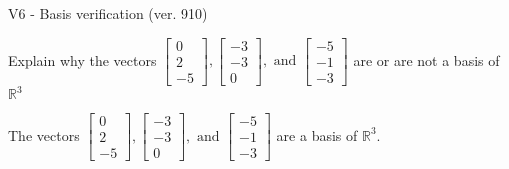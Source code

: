\begin{exercise}
  \begin{exerciseTitle}V6 - Basis verification (ver. 910)\end{exerciseTitle}
  \begin{exerciseStatement}
    Explain why the vectors \(\left[\begin{array}{r}
0 \\
2 \\
-5
\end{array}\right] , \left[\begin{array}{r}
-3 \\
-3 \\
0
\end{array}\right] , \text{ and } \left[\begin{array}{r}
-5 \\
-1 \\
-3
\end{array}\right]\) are or are not a basis of \(\mathbb{R}^3\)	


  \end{exerciseStatement}
  \begin{exerciseAnswer}
   The vectors \(\left[\begin{array}{r}
0 \\
2 \\
-5
\end{array}\right] , \left[\begin{array}{r}
-3 \\
-3 \\
0
\end{array}\right] , \text{ and } \left[\begin{array}{r}
-5 \\
-1 \\
-3
\end{array}\right]\) 
  	 are  a basis of \(\mathbb{R}^3\).
  


  \end{exerciseAnswer}
\end{exercise}
